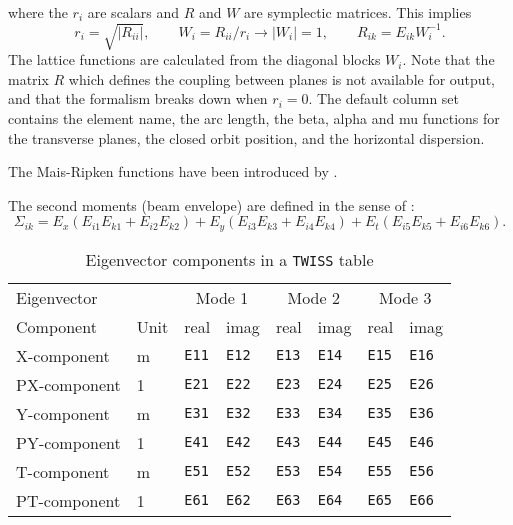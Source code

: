 where the $r_i$ are scalars and $R$ and $W$ are symplectic matrices.
This implies
\[
r_i = \sqrt{|R_{ii}|}, \qquad
W_i = R_{ii} / r_i \rightarrow |W_i| = 1, \qquad
R_{ik} = E_{ik} W_i^{-1}.
\]
The lattice functions are calculated from the diagonal blocks $W_i$.
Note that the matrix $R$ which defines the coupling between planes is
not available for output,
and that the formalism breaks down when $r_i=0$.
The default column set contains the element name,
the arc length, the beta, alpha and mu functions for the transverse
planes,
the closed orbit position, and the horizontal dispersion.

The Mais-Ripken functions have been introduced by
.

The second moments (beam envelope) are defined in the sense of
:
\[
  \Sigma_{ik} = E_x ( E_{i1} E_{k1} + E_{i2} E_{k2}) +
                E_y ( E_{i3} E_{k3} + E_{i4} E_{k4}) +
                E_t ( E_{i5} E_{k5} + E_{i6} E_{k6}).
\]

\begin{table}[Ht] \footnotesize
  \begin{center}
    \caption{Eigenvector components in a \texttt{TWISS} table}
    \label{tab:twiss-eig}
    \begin{tabular}{|l|l|l|l|l|l|l|l|}
      \hline
      Eigenvector & &
      \multicolumn{2}{c|}{Mode 1} &
      \multicolumn{2}{c|}{Mode 2} &
      \multicolumn{2}{c|}{Mode 3} \\
      Component & Unit & real & imag & real & imag & real & imag \\
      \hline
      X-component & m &
      \texttt{E11}\index{E11} & \texttt{E12}\index{E12} &
      \texttt{E13}\index{E13} & \texttt{E14}\index{E14} &
      \texttt{E15}\index{E15} & \texttt{E16}\index{E16} \\
      PX-component & 1 &
      \texttt{E21}\index{E21} & \texttt{E22}\index{E22} &
      \texttt{E23}\index{E23} & \texttt{E24}\index{E24} &
      \texttt{E25}\index{E25} & \texttt{E26}\index{E26} \\
      Y-component & m &
      \texttt{E31}\index{E31} & \texttt{E32}\index{E32} &
      \texttt{E33}\index{E33} & \texttt{E34}\index{E34} &
      \texttt{E35}\index{E35} & \texttt{E36}\index{E36} \\
      PY-component & 1 &
      \texttt{E41}\index{E41} & \texttt{E42}\index{E42} &
      \texttt{E43}\index{E43} & \texttt{E44}\index{E44} &
      \texttt{E45}\index{E45} & \texttt{E46}\index{E46} \\
      T-component & m &
      \texttt{E51}\index{E51} & \texttt{E52}\index{E52} &
      \texttt{E53}\index{E53} & \texttt{E54}\index{E54} &
      \texttt{E55}\index{E55} & \texttt{E56}\index{E56} \\
      PT-component & 1 &
      \texttt{E61}\index{E61} & \texttt{E62}\index{E62} &
      \texttt{E63}\index{E63} & \texttt{E64}\index{E64} &
      \texttt{E65}\index{E65} & \texttt{E66}\index{E66} \\
      \hline
    \end{tabular}
  \end{center}
\end{table}

